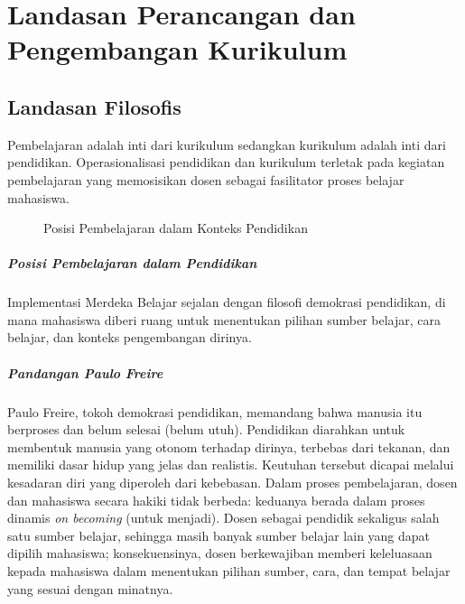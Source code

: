 \chapter{Landasan Perancangan dan Pengembangan Kurikulum}

\section{Landasan Filosofis}

Pembelajaran adalah inti dari kurikulum sedangkan kurikulum adalah inti dari pendidikan. Operasionalisasi pendidikan dan kurikulum terletak pada kegiatan pembelajaran yang memosisikan dosen sebagai fasilitator proses belajar mahasiswa.

\begin{figure}[H]
\centering
{}
\caption{Posisi Pembelajaran dalam Konteks Pendidikan}
\end{figure}

\paragraph{Posisi Pembelajaran dalam Pendidikan} Implementasi Merdeka Belajar sejalan dengan filosofi demokrasi pendidikan, di mana mahasiswa diberi ruang untuk menentukan pilihan sumber belajar, cara belajar, dan konteks pengembangan dirinya.

\paragraph{Pandangan Paulo Freire} Paulo Freire, tokoh demokrasi pendidikan, memandang bahwa manusia itu berproses dan belum selesai (belum utuh). Pendidikan diarahkan untuk membentuk manusia yang otonom terhadap dirinya, terbebas dari tekanan, dan memiliki dasar hidup yang jelas dan realistis. Keutuhan tersebut dicapai melalui kesadaran diri yang diperoleh dari kebebasan. Dalam proses pembelajaran, dosen dan mahasiswa secara hakiki tidak berbeda: keduanya berada dalam proses dinamis \emph{on becoming} (untuk menjadi). Dosen sebagai pendidik sekaligus salah satu sumber belajar, sehingga masih banyak sumber belajar lain yang dapat dipilih mahasiswa; konsekuensinya, dosen berkewajiban memberi keleluasaan kepada mahasiswa dalam menentukan pilihan sumber, cara, dan tempat belajar yang sesuai dengan minatnya.

